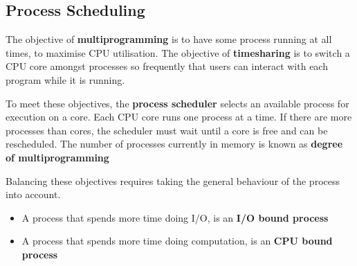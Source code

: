 \documentclass{article}
\begin{document}
\subsection{Process Scheduling}
The objective of \textbf{multiprogramming} is to have some process
running at all times, to maximise CPU utilisation. The objective of
\textbf{timesharing} is to switch a CPU core amongst processes so
frequently that users can interact with each program while it is
running.

To meet these objectives, the \textbf{process scheduler} selects an
available process for execution on a core. Each CPU core runs one
process at a time. If there are more processes than cores, the
scheduler must wait until a core is free and can be rescheduled. The
number of processes currently in memory is known as \textbf{degree of
multiprogramming}

Balancing these objectives requires taking the general behaviour of the
process into account.
\begin{itemize}
    \item A process that spends more time doing I/O, is an \textbf{I/O
          bound process}
    \item A process that spends more time doing computation, is an
          \textbf{CPU bound process}
\end{itemize}
\end{document}
